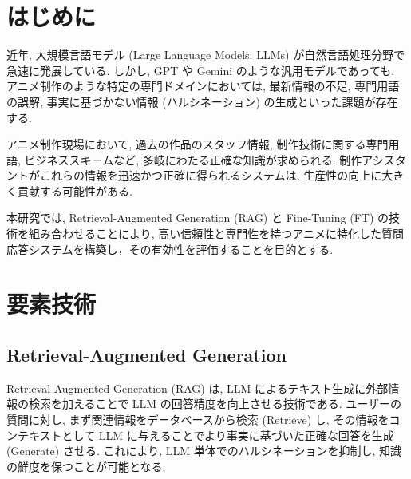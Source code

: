 \documentclass{jarticle}
\begin{document}

\vspace{-3mm}
\section{はじめに}
\vspace{-1mm}

近年, 大規模言語モデル (Large Language Models: LLMs) が自然言語処理分野で急速に発展している. しかし, GPT や Gemini のような汎用モデルであっても, アニメ制作のような特定の専門ドメインにおいては, 最新情報の不足, 専門用語の誤解, 事実に基づかない情報 (ハルシネーション) の生成といった課題が存在する.\par

アニメ制作現場において, 過去の作品のスタッフ情報, 制作技術に関する専門用語, ビジネススキームなど, 多岐にわたる正確な知識が求められる. 制作アシスタントがこれらの情報を迅速かつ正確に得られるシステムは, 生産性の向上に大きく貢献する可能性がある. \par

本研究では, Retrieval-Augmented Generation (RAG) と Fine-Tuning (FT) の技術を組み合わせることにより, 高い信頼性と専門性を持つアニメに特化した質問応答システムを構築し，その有効性を評価することを目的とする. \par

\vspace{-3mm}
\section{要素技術}
\vspace{-1mm}

\subsection{Retrieval-Augmented Generation}
\vspace{-1mm}

Retrieval-Augmented Generation (RAG) \cite{RAG_first} は, LLM によるテキスト生成に外部情報の検索を加えることで LLM の回答精度を向上させる技術である. ユーザーの質問に対し, まず関連情報をデータベースから検索 (Retrieve) し, その情報をコンテキストとして LLM に与えることでより事実に基づいた正確な回答を生成 (Generate) させる. これにより, LLM 単体でのハルシネーションを抑制し, 知識の鮮度を保つことが可能となる.
\end{document}

